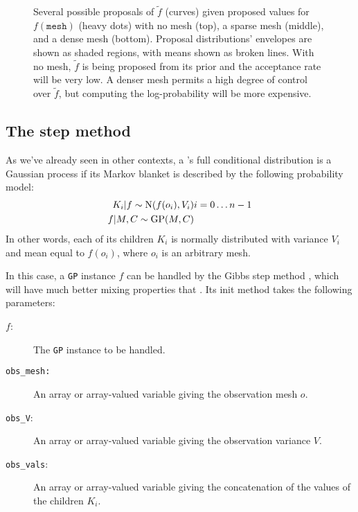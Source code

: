 \documentclass[]{manual}
\begin{document}
\begin{figure}
    \centering
    \caption{Several possible proposals of $\tilde f$ (curves) given proposed values for $f(\texttt{mesh})$ (heavy dots) with no mesh (top), a sparse mesh (middle), and a dense mesh (bottom). Proposal distributions' envelopes are shown as shaded regions, with means shown as broken lines. With no mesh, $\tilde f$ is being proposed from its prior and the acceptance rate will be very low. A denser mesh permits a high degree of control over $\tilde f$, but computing the log-probability will be more expensive.}
    \label{fig:meshpropose}
\end{figure}


\subsection{The  step method}
As we've already seen in other contexts, a 's full conditional distribution is a Gaussian process if its Markov blanket is described by the following probability model:
\begin{eqnarray*}
    K_i |f \sim \textup{N}(f(o_i), V_i) & i=0\ldots n-1\\
    f|M,C\sim\textup{GP}(M,C)
\end{eqnarray*}
In other words, each of its children $K_i$ is normally distributed with variance $V_i$ and mean equal to $f(o_i)$, where $o_i$ is an arbitrary mesh. 

In this case, a \texttt{GP} instance $f$ can be handled by the Gibbs step method , which will have much better mixing properties that . Its init method takes the following parameters:
\begin{description}
    \item[$f$:] The \texttt{GP} instance to be handled.
    \item[\texttt{obs_mesh:}] An array or array-valued variable giving the observation mesh $o$.
    \item[\texttt{obs_V}:] An array or array-valued variable giving the observation variance $V$. 
    \item[\texttt{obs_vals}:] An array or array-valued variable giving the concatenation of the values of the children $K_i$.
\end{description}
\end{document}

